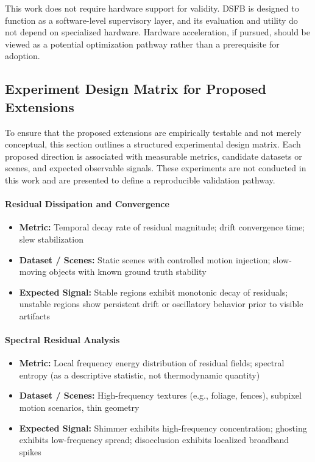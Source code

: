 \documentclass[11pt,letterpaper]{article}
\theoremstyle{gcresult}
\theoremstyle{definition}
\begin{document}
This work does not require hardware support for validity. DSFB is designed to function as a software-level supervisory layer, and its evaluation and utility do not depend on specialized hardware. Hardware acceleration, if pursued, should be viewed as a potential optimization pathway rather than a prerequisite for adoption.





\subsection{Experiment Design Matrix for Proposed Extensions}

To ensure that the proposed extensions are empirically testable and not merely conceptual, this section outlines a structured experimental design matrix. Each proposed direction is associated with measurable metrics, candidate datasets or scenes, and expected observable signals. These experiments are not conducted in this work and are presented to define a reproducible validation pathway.

\paragraph{Residual Dissipation and Convergence}
\begin{itemize}
    \item \textbf{Metric:} Temporal decay rate of residual magnitude; drift convergence time; slew stabilization
    \item \textbf{Dataset / Scenes:} Static scenes with controlled motion injection; slow-moving objects with known ground truth stability
    \item \textbf{Expected Signal:} Stable regions exhibit monotonic decay of residuals; unstable regions show persistent drift or oscillatory behavior prior to visible artifacts
\end{itemize}

\paragraph{Spectral Residual Analysis}
\begin{itemize}
    \item \textbf{Metric:} Local frequency energy distribution of residual fields; spectral entropy (as a descriptive statistic, not thermodynamic quantity)
    \item \textbf{Dataset / Scenes:} High-frequency textures (e.g., foliage, fences), subpixel motion scenarios, thin geometry
    \item \textbf{Expected Signal:} Shimmer exhibits high-frequency concentration; ghosting exhibits low-frequency spread; disocclusion exhibits localized broadband spikes
\end{itemize}
\end{document}
